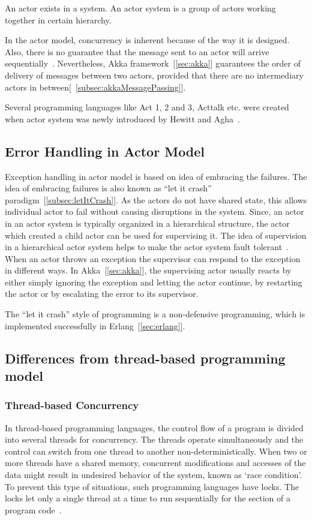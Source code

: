   An actor exists in a system. An actor system is a group of actors working together in certain hierarchy.

  In the actor model, concurrency is inherent because of the way it is designed. Also, there is no guarantee that the message sent to an actor will arrive sequentially~\cite{hewittVideo}. Nevertheless, Akka framework~[\autoref{sec:akka}] guarantees the order of delivery of messages between two actors, provided that there are no intermediary actors in between[~\autoref{subsec:akkaMessagePassing}].

  Several programming languages like Act 1, 2 and 3, Acttalk etc. were created when actor system was newly introduced by Hewitt and Agha~\cite{agha, hewitt}.

\subsection{Error Handling in Actor Model}
Exception handling in actor model is based on idea of embracing the failures. The idea of embracing failures is also known as “let it crash” paradigm~[\autoref{subsec:letItCrash}]. As the actors do not have shared state, this allows individual actor to fail without causing disruptions in the system. Since, an actor in an actor system is typically organized in a hierarchical structure, the actor which created a child actor can be used for supervising it. The idea of supervision in a hierarchical actor system helps to make the actor system fault tolerant~\cite{Erb2012}. When an actor throws an exception the supervisor can respond to the exception in different ways. In Akka~[\autoref{sec:akka}], the supervising actor usually reacts by either simply ignoring the exception and letting the actor continue, by restarting the actor or by escalating the error to its supervisor.

  The “let it crash” style of programming is a non-defensive programming, which is implemented successfully in Erlang~[\autoref{sec:erlang}].

\subsection{Differences from thread-based programming model}
\subsubsection{Thread-based Concurrency}
  \label{subsec:thread}
  In thread-based programming languages, the control flow of a program is divided into several threads for concurrency. The threads operate simultaneously and the control can switch from one thread to another non-deterministically. When two or more threads have a shared memory, concurrent modifications and accesses of the data might result in undesired behavior of the system, known as ‘race condition’. To prevent this type of situations, such programming languages have locks. The locks let only a single thread at a time to run sequentially for the section of a program code~\cite{ambientTalk}.

